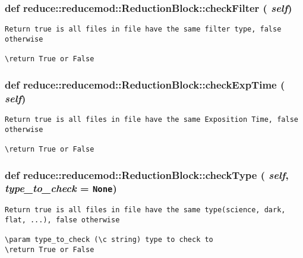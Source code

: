 \subsubsection{\setlength{\rightskip}{0pt plus 5cm}def reduce::reducemod::Reduction\-Block::check\-Filter ( {\em self})}\label{classreduce_1_1reducemod_1_1ReductionBlock_47ee720852bff59774e2afa327763d70}




\footnotesize\begin{verbatim}Return true is all files in file have the same filter type, false otherwise

\return True or False
\end{verbatim}
\normalsize
\subsubsection{\setlength{\rightskip}{0pt plus 5cm}def reduce::reducemod::Reduction\-Block::check\-Exp\-Time ( {\em self})}\label{classreduce_1_1reducemod_1_1ReductionBlock_2c4edab90430d24a93f7e7fb9059019a}




\footnotesize\begin{verbatim}Return true is all files in file have the same Exposition Time, false otherwise

\return True or False
\end{verbatim}
\normalsize
\subsubsection{\setlength{\rightskip}{0pt plus 5cm}def reduce::reducemod::Reduction\-Block::check\-Type ( {\em self},  {\em type\_\-to\_\-check} = {\tt None})}\label{classreduce_1_1reducemod_1_1ReductionBlock_77b103bc9634e74234fe5d41a07f00dd}




\footnotesize\begin{verbatim}
Return true is all files in file have the same type(science, dark, flat, ...), false otherwise

\param type_to_check (\c string) type to check to
\return True or False
\end{verbatim}
\normalsize
